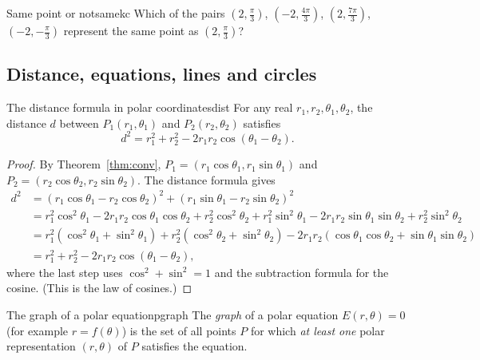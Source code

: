 \documentclass[11pt]{article}
\begin{document}
\begin{kc}{Same point or not}{samekc}
Which of the pairs $\left(2,\frac\pi3\right)$, $\left(-2,\frac{4\pi}3\right)$, $\left(2,\frac{7\pi}3\right)$, $\left(-2,-\frac\pi3\right)$ represent the same point as $\left(2,\frac\pi3\right)$?
\end{kc}

\subsection*{Distance, equations, lines and circles}

\begin{thm}{The distance formula in polar coordinates}{dist}
For any real $r_1,r_2,\theta_1,\theta_2$, the distance $d$ between $P_1(r_1,\theta_1)$ and $P_2(r_2,\theta_2)$ satisfies
\[
d^2=r_1^2+r_2^2-2r_1r_2\cos(\theta_1-\theta_2).
\]
\end{thm}
\begin{proof}
By Theorem~\ref{thm:conv}, $P_1=(r_1\cos\theta_1,r_1\sin\theta_1)$ and $P_2=(r_2\cos\theta_2,r_2\sin\theta_2)$. The distance formula gives
\begin{align*}
d^2&=(r_1\cos\theta_1-r_2\cos\theta_2)^2+(r_1\sin\theta_1-r_2\sin\theta_2)^2\\
&=r_1^2\cos^2\theta_1-2r_1r_2\cos\theta_1\cos\theta_2+r_2^2\cos^2\theta_2+r_1^2\sin^2\theta_1-2r_1r_2\sin\theta_1\sin\theta_2+r_2^2\sin^2\theta_2\\
&=r_1^2\left(\cos^2\theta_1+\sin^2\theta_1\right)+r_2^2\left(\cos^2\theta_2+\sin^2\theta_2\right)-2r_1r_2\left(\cos\theta_1\cos\theta_2+\sin\theta_1\sin\theta_2\right)\\
&=r_1^2+r_2^2-2r_1r_2\cos(\theta_1-\theta_2),
\end{align*}
where the last step uses $\cos^2+\sin^2=1$ and the subtraction formula for the cosine. (This is the law of cosines.)
\end{proof}

\begin{defn}{The graph of a polar equation}{pgraph}
The \emph{graph} of a polar equation $E(r,\theta)=0$ (for example $r=f(\theta)$) is the set of all points $P$ for which \emph{at least one} polar representation $(r,\theta)$ of $P$ satisfies the equation.
\end{defn}
\end{document}
